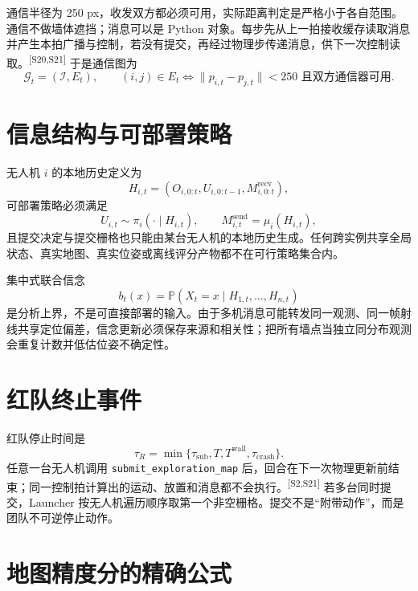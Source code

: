 \documentclass[UTF8,11pt]{ctexart}
\newcommand{\src}[1]{\textsuperscript{\textcolor{blue!65!black}{[#1]}}}
\newcommand{\Prob}{\mathbb{P}}
\begin{document}
通信半径为 250 px，收发双方都必须可用，实际距离判定是严格小于各自范围。通信不做墙体遮挡；消息可以是 Python 对象。每步先从上一拍接收缓存读取消息并产生本拍广播与控制，若没有提交，再经过物理步传递消息，供下一次控制读取。\src{S20,S21} 于是通信图为
\begin{equation}
\mathcal G_t=(\mathcal I,E_t),\qquad
(i,j)\in E_t\Longleftrightarrow \|p_{i,t}-p_{j,t}\|<250
\text{ 且双方通信器可用}.
\end{equation}

\section{信息结构与可部署策略}

无人机 $i$ 的本地历史定义为
\begin{equation}
H_{i,t}=(O_{i,0:t},U_{i,0:t-1},M^{\mathrm{recv}}_{i,0:t}),
\end{equation}
可部署策略必须满足
\begin{equation}
U_{i,t}\sim\pi_i(\cdot\mid H_{i,t}),\qquad
M^{\mathrm{send}}_{i,t}=\mu_i(H_{i,t}),
\label{eq:local-policy}
\end{equation}
且提交决定与提交栅格也只能由某台无人机的本地历史生成。任何跨实例共享全局状态、真实地图、真实位姿或离线评分产物都不在可行策略集合内。

集中式联合信念
\begin{equation}
b_t(x)=\Prob(X_t=x\mid H_{1,t},\ldots,H_{n,t})
\end{equation}
是分析上界，不是可直接部署的输入。由于多机消息可能转发同一观测、同一帧射线共享定位偏差，信念更新必须保存来源和相关性；把所有墙点当独立同分布观测会重复计数并低估位姿不确定性。

\section{红队终止事件}

红队停止时间是
\begin{equation}
\tau_R=\min\{\tau_{\mathrm{sub}},T,T^{\mathrm{wall}},\tau_{\mathrm{crash}}\}.
\end{equation}
任意一台无人机调用 \texttt{submit\_exploration\_map} 后，回合在下一次物理更新前结束；同一控制拍计算出的运动、放置和消息都不会执行。\src{S2,S21} 若多台同时提交，Launcher 按无人机遍历顺序取第一个非空栅格。提交不是“附带动作”，而是团队不可逆停止动作。

\section{地图精度分的精确公式}
\end{document}
